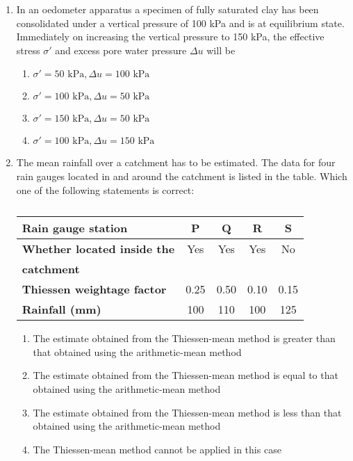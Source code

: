 \documentclass[journal,12pt,onecolumn]{article}
\theoremstyle{remark}
\begin{document}
\begin{enumerate}
\item In an oedometer apparatus a specimen of fully saturated clay has been consolidated under a vertical pressure of 100 kPa and is at equilibrium state. Immediately on increasing the vertical pressure to 150 kPa, the effective stress $\sigma'$ and excess pore water pressure $\Delta u$ will be

\hfill{}
\begin{enumerate}
    \item $\sigma' = 50 \text{ kPa}, \Delta u = 100 \text{ kPa}$
    \item $\sigma' = 100 \text{ kPa}, \Delta u = 50 \text{ kPa}$
    \item $\sigma' = 150 \text{ kPa}, \Delta u = 50 \text{ kPa}$
    \item $\sigma' = 100 \text{ kPa}, \Delta u = 150 \text{ kPa}$
\end{enumerate}

\item The mean rainfall over a catchment has to be estimated. The data for four rain gauges located in and around the catchment is listed in the table. Which one of the following statements is correct:
\begin{table}[H]
    \centering
    \begin{tabular}{|l|c|c|c|c|}
        \hline
        \textbf{Rain gauge station} & P & Q & R & S \\
        \hline
        \textbf{Whether located inside the} & Yes & Yes & Yes & No \\
        \textbf{catchment} & & & & \\
        \hline
        \textbf{Thiessen weightage factor} & 0.25 & 0.50 & 0.10 & 0.15 \\
        \hline
        \textbf{Rainfall (mm)} & 100 & 110 & 100 & 125 \\
        \hline
    \end{tabular}
    \caption{}
    \label{tab:q39}
\end{table}

\hfill{}
\begin{enumerate}
    \item The estimate obtained from the Thiessen-mean method is greater than that obtained using the arithmetic-mean method
    \item The estimate obtained from the Thiessen-mean method is equal to that obtained using the arithmetic-mean method
    \item The estimate obtained from the Thiessen-mean method is less than that obtained using the arithmetic-mean method
    \item The Thiessen-mean method cannot be applied in this case
\end{enumerate}


\end{enumerate}
\end{document}
